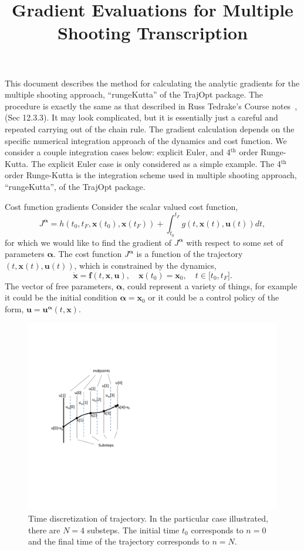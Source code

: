\documentclass[onecolumn,12pt]{article}
\title{{\huge Gradient Evaluations for Multiple Shooting Transcription }}
\author{\Large }
\makeatletter
\newcommand{\bs}{\boldsymbol}
\def\section{\@startsection {section}{1}{\z@}{24pt plus 2pt minus 2pt}
{12pt plus 2pt minus 2pt}{\large\bf\color{RoyalBlue}}}
\makeatother
\begin{document}

This document describes the method for calculating the analytic gradients for the multiple shooting approach, ``rungeKutta'' of the TrajOpt package. The procedure is exactly the same as that described in Russ Tedrake's Course notes~\cite{tedrakeNotes},(Sec 12.3.3). It may look complicated, but it is essentially just a careful and repeated carrying out of the chain rule. The gradient calculation depends on the specific numerical integration approach of the dynamics and cost function. We consider a couple integration cases below: explicit Euler, and 4$^{\text{th}}$ order Runge-Kutta. The explicit Euler case is only considered as a simple example. The 4$^{\text{th}}$ order Runge-Kutta is the integration scheme used in multiple shooting approach, ``rungeKutta'', of the TrajOpt package.

\section{Cost function gradients}
Consider the scalar valued cost function,
\begin{equation}
J^{\bs \alpha} = h(t_0,t_F,\bs x(t_0),\bs x(t_F)) + \int_{t_0}^{t_F}  g(t, \bs x(t), \bs u(t)) dt,
\label{eq:Cost}
\end{equation}
for which we would like to find the gradient of $J^{\bs \alpha}$ with respect to some set of parameters $\bs \alpha$. The cost function $J^{\bs \alpha}$ is a function of the trajectory $(t,\bs x(t),\bs u(t))$, which is constrained by the dynamics,
\begin{equation}
\dot{\bs x} =\bs f(t,\bs x,\bs u), \quad \bs x(t_0) = \bs x_0, \quad t \in \lbrack t_0, t_F\rbrack.
\label{eq:dynamics}
\end{equation}
The vector of free parameters, $\bs \alpha$, could represent a variety of things, for example it could be the initial condition $\bs \alpha = \bs x_0$ or it could be a control policy of the form, $\bs u = \bs u^{\bs \alpha}(t,\bs x)$.

\begin{figure}[h]
\centering
\hspace{0mm}
\includegraphics[width=.38\textwidth]{Figures/singleShooting.pdf}
\vspace{-2mm} 
\caption{Time discretization of trajectory. In the particular case illustrated, there are $N=4$ substeps. The initial time $t_0$ corresponds to $n=0$ and the final time of the trajectory corresponds to $n=N$.}
\label{fig:singleShoot}
\end{figure}
\end{document}
